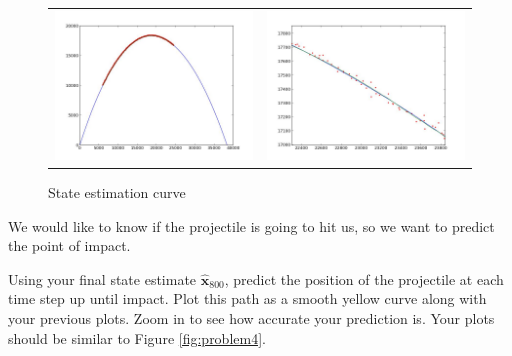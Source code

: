 \begin{figure}
	\centering
	\begin{tabular}{cc} 
	\includegraphics[width=.49\textwidth]{problem3_1.jpg} & 
	\includegraphics[width=.49\textwidth]{problem3_2.jpg}
	\end{tabular}
	\caption{State estimation curve}
	\label{fig:problem3}
\end{figure}

We would like to know if the projectile is going to hit us, so we want to predict the point of impact.

\begin{problem}
Using your final state estimate $\widehat{\mathbf{x}}_{800}$, predict the position of the projectile at each time step up until impact. Plot this path as a smooth yellow curve along with your previous plots. Zoom in to see how accurate your prediction is. Your plots should be similar to Figure \ref{fig:problem4}.
\end{problem}

